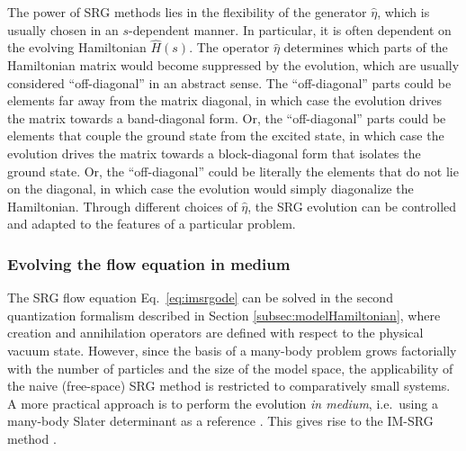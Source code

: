 \documentclass[aip, jcp, 12pt]{revtex4-1}
\begin{document}
The power of SRG methods lies in the flexibility of the generator $\hat{\eta}$, which is usually chosen in an $s$-dependent manner.  In particular, it is often dependent on the evolving Hamiltonian $\hat{H}(s)$.  The operator $\hat{\eta}$ determines which parts of the Hamiltonian matrix would become suppressed by the evolution, which are usually considered ``off-diagonal'' in an abstract sense.  The ``off-diagonal'' parts could be elements far away from the matrix diagonal, in which case the evolution drives the matrix towards a band-diagonal form.  Or, the ``off-diagonal'' parts could be elements that couple the ground state from the excited state, in which case the evolution drives the matrix towards a block-diagonal form that isolates the ground state.  Or, the ``off-diagonal'' could be literally the elements that do not lie on the diagonal, in which case the evolution would simply diagonalize the Hamiltonian.  Through different choices of $\hat{\eta}$, the SRG evolution can be controlled and adapted to the features of a particular problem.

\subsubsection{Evolving the flow equation in medium}

The SRG flow equation Eq.\ \eqref{eq:imsrgode} can be solved in the second quantization formalism described in Section \ref{subsec:modelHamiltonian}, where creation and annihilation operators are defined with respect to the physical vacuum state.  However, since the basis of a many-body problem grows factorially with the number of particles and the size of the model space, the applicability of the naive (free-space) SRG method is restricted to comparatively small systems.  A more practical approach is to perform the evolution \textit{in medium}, i.e.\ using a many-body Slater determinant as a reference \cite{kehrein2006flow}.  This gives rise to the IM-SRG method \cite{PhysRevC.85.061304,Hergert2016165,lnp936}.
\end{document}
